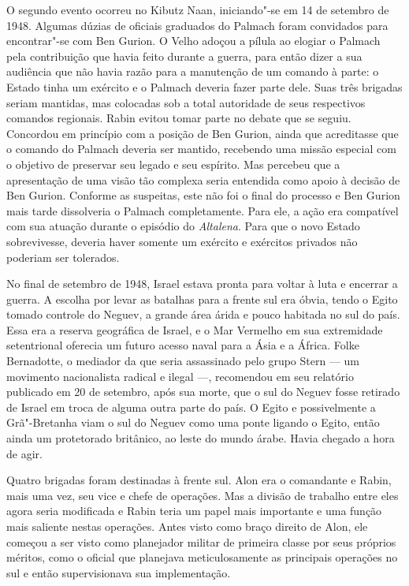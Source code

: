 O segundo evento ocorreu no Kibutz Naan, iniciando"-se em 14 de setembro
de 1948. Algumas dúzias de oficiais graduados do Palmach foram
convidados para encontrar"-se com Ben Gurion. O Velho adoçou a pílula ao
elogiar o Palmach pela contribuição que havia feito durante a guerra,
para então dizer a sua audiência que não havia razão para a manutenção
de um comando à parte: o Estado tinha um exército e o Palmach deveria
fazer parte dele. Suas três brigadas seriam mantidas, mas colocadas sob
a total autoridade de seus respectivos comandos regionais. Rabin evitou
tomar parte no debate que se seguiu. Concordou em princípio com a
posição de Ben Gurion, ainda que acreditasse que o comando do Palmach
deveria ser mantido, recebendo uma missão especial com o objetivo de
preservar seu legado e seu espírito. Mas percebeu que a apresentação de
uma visão tão complexa seria entendida como apoio à decisão de Ben
Gurion. Conforme as suspeitas, este não foi o final do processo e Ben
Gurion mais tarde dissolveria o Palmach completamente. Para ele, a ação
era compatível com sua atuação durante o episódio do \emph{Altalena}.
Para que o novo Estado sobrevivesse, deveria haver somente um exército e
exércitos privados não poderiam ser tolerados.

No final de setembro de 1948, Israel estava pronta para voltar à luta e
encerrar a guerra. A escolha por levar as batalhas para a frente sul era
óbvia, tendo o Egito tomado controle do Neguev, a grande área árida e
pouco habitada no sul do país. Essa era a reserva geográfica de Israel, e
o Mar Vermelho em sua extremidade setentrional oferecia um futuro acesso
naval para a Ásia e a África. Folke Bernadotte, o mediador da  que
seria assassinado pelo grupo Stern --- um movimento nacionalista radical e
ilegal ---, recomendou em seu relatório publicado em 20 de setembro, após
sua morte, que o sul do Neguev fosse retirado de Israel em troca de
alguma outra parte do país. O Egito e possivelmente a Grã"-Bretanha viam
o sul do Neguev como uma ponte ligando o Egito, então ainda um
protetorado britânico, ao leste do mundo árabe. Havia chegado a hora de
agir.

Quatro brigadas foram destinadas à frente sul. Alon era o comandante e
Rabin, mais uma vez, seu vice e chefe de operações. Mas a divisão de
trabalho entre eles agora seria modificada e Rabin teria um papel mais
importante e uma função mais saliente nestas operações. Antes visto como
braço direito de Alon, ele começou a ser visto como planejador militar
de primeira classe por seus próprios méritos, como o oficial que planejava
meticulosamente as principais operações no sul e então supervisionava
sua implementação.

